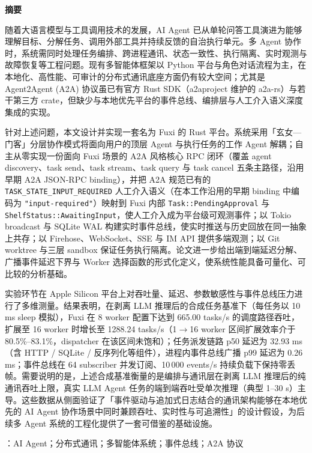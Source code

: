 \thispagestyle{empty}
\begin{center}
  {\bfseries 摘\quad 要}
\end{center}

\vspace{1em}

随着大语言模型与工具调用技术的发展，AI Agent 已从单轮问答工具演进为能够理解目标、分解任务、调用外部工具并持续反馈的自治执行单元。多 Agent 协作时，系统需同时处理任务编排、跨进程通讯、状态一致性、执行隔离、实时观测与故障恢复等工程问题。现有多智能体框架以 Python 平台与角色对话流程为主，在本地化、高性能、可审计的分布式通讯底座方面仍有较大空间；尤其是 Agent2Agent (A2A) 协议虽已有官方 Rust SDK（a2aproject 维护的 a2a-rs）与若干第三方 crate，但缺少与本地优先平台的事件总线、编排层与人工介入语义深度集成的实现。

针对上述问题，本文设计并实现一套名为 Fuxi 的 Rust 平台。系统采用「玄女—门客」分层协作模式将面向用户的顶层 Agent 与执行任务的工作 Agent 解耦；自主从零实现一份面向 Fuxi 场景的 A2A 风格核心 RPC 闭环（覆盖 agent discovery、task send、task stream、task query 与 task cancel 五条主路径，沿用早期 A2A JSON-RPC binding），并把 A2A 规范已有的 \texttt{TASK\_STATE\_INPUT\_REQUIRED} 人工介入语义（在本工作沿用的早期 binding 中编码为 \texttt{"input-required"}）映射到 Fuxi 内部 \texttt{Task::PendingApproval} 与 \texttt{ShelfStatus::AwaitingInput}，使人工介入成为平台级可观测事件；以 Tokio broadcast 与 SQLite WAL 构建实时事件总线，使实时推送与历史回放在同一抽象上共存；以 Firehose、WebSocket、SSE 与 IM API 提供多端观测；以 Git worktree 与三层 sandbox 保证任务执行隔离。论文进一步给出端到端延迟分解、广播事件延迟下界与 Worker 选择函数的形式化定义，使系统性能具备可量化、可比较的分析基础。

实验环节在 Apple Silicon 平台上对吞吐量、延迟、参数敏感性与事件总线压力进行了多维测量。结果表明，在剥离 LLM 推理后的合成任务基准下（每任务以 10 ms sleep 模拟），Fuxi 在 8 worker 配置下达到 665.00 tasks/s 的调度路径吞吐，扩展至 16 worker 时增长至 1288.24 tasks/s（1$\rightarrow$16 worker 区间扩展效率介于 80.5\%--83.1\%，dispatcher 在该区间未饱和）；任务派发链路 p50 延迟为 32.93 ms（含 HTTP / SQLite / 反序列化等组件），进程内事件总线广播 p99 延迟为 0.26 ms；事件总线在 64 subscriber 并发订阅、10\,000 events/s 持续负载下保持零丢帧。需要说明的是，上述合成基准衡量的是编排与通讯层在剥离 LLM 推理后的纯通讯吞吐上限，真实 LLM Agent 任务的端到端吞吐受单次推理（典型 1--30 s）主导。这些数据从侧面验证了「事件驱动与追加式日志结合的通讯架构能够在本地优先的 AI Agent 协作场景中同时兼顾吞吐、实时性与可追溯性」的设计假设，为后续多 Agent 系统的工程化提供了一套可借鉴的基础设施。

\vspace{1.5em}

：AI Agent；分布式通讯；多智能体系统；事件总线；A2A 协议
